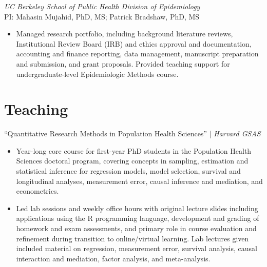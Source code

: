 \documentclass{cv_style}
\begin{document}
\textit{UC Berkeley School of Public Health Division of Epidemiology} \\
PI: Mahasin Mujahid, PhD, MS; Patrick Bradshaw, PhD, MS
\begin{itemize}
    \item Managed research portfolio, including background literature reviews, Institutional Review Board (IRB) and ethics approval and documentation, accounting and finance reporting, data management, manuscript preparation and submission, and grant proposals. Provided teaching support for undergraduate-level Epidemiologic Methods course.
\end{itemize}


\parskip -5pt 
\section{Teaching}

``Quantitative Research Methods in Population Health Sciences'' | \textit{Harvard GSAS}
\begin{itemize}
  \vspace{0em} \item Year-long core course for first-year PhD students in the Population Health Sciences doctoral program, covering concepts in sampling, estimation and statistical inference for regression models, model selection, survival and longitudinal analyses, measurement error, causal inference and mediation, and econometrics. 
  \item \parskip 1pt Led lab sessions and weekly office hours with original lecture slides including applications using the R programming language, development and grading of homework and exam assessments, and primary role in course evaluation and refinement during transition to online/virtual learning. Lab lectures given included material on regression, measurement error, survival analysis, causal interaction and mediation, factor analysis, and meta-analysis.
\end{itemize}
\end{document}
